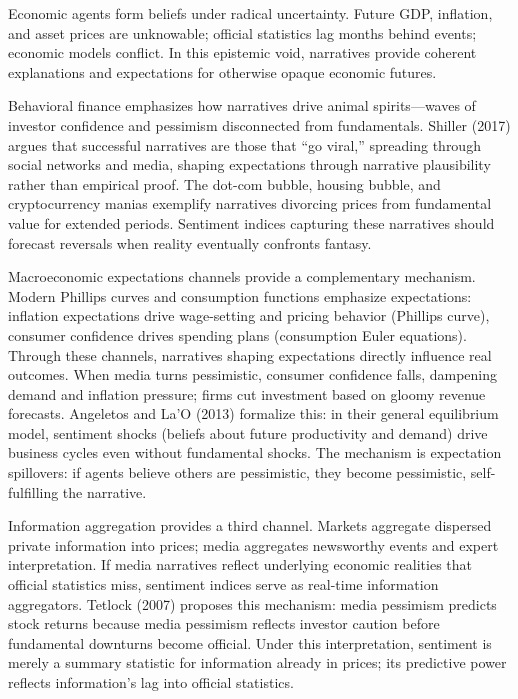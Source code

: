 \documentclass[11pt]{article}
\begin{document}
Economic agents form beliefs under radical uncertainty. Future GDP, inflation, and asset prices are unknowable; official statistics lag months behind events; economic models conflict. In this epistemic void, narratives provide coherent explanations and expectations for otherwise opaque economic futures.

Behavioral finance emphasizes how narratives drive animal spirits---waves of investor confidence and pessimism disconnected from fundamentals. Shiller (2017) argues that successful narratives are those that ``go viral,'' spreading through social networks and media, shaping expectations through narrative plausibility rather than empirical proof. The dot-com bubble, housing bubble, and cryptocurrency manias exemplify narratives divorcing prices from fundamental value for extended periods. Sentiment indices capturing these narratives should forecast reversals when reality eventually confronts fantasy.

Macroeconomic expectations channels provide a complementary mechanism. Modern Phillips curves and consumption functions emphasize expectations: inflation expectations drive wage-setting and pricing behavior (Phillips curve), consumer confidence drives spending plans (consumption Euler equations). Through these channels, narratives shaping expectations directly influence real outcomes. When media turns pessimistic, consumer confidence falls, dampening demand and inflation pressure; firms cut investment based on gloomy revenue forecasts. Angeletos and La'O (2013) formalize this: in their general equilibrium model, sentiment shocks (beliefs about future productivity and demand) drive business cycles even without fundamental shocks. The mechanism is expectation spillovers: if agents believe others are pessimistic, they become pessimistic, self-fulfilling the narrative.

Information aggregation provides a third channel. Markets aggregate dispersed private information into prices; media aggregates newsworthy events and expert interpretation. If media narratives reflect underlying economic realities that official statistics miss, sentiment indices serve as real-time information aggregators. Tetlock (2007) proposes this mechanism: media pessimism predicts stock returns because media pessimism reflects investor caution before fundamental downturns become official. Under this interpretation, sentiment is merely a summary statistic for information already in prices; its predictive power reflects information's lag into official statistics.
\end{document}
